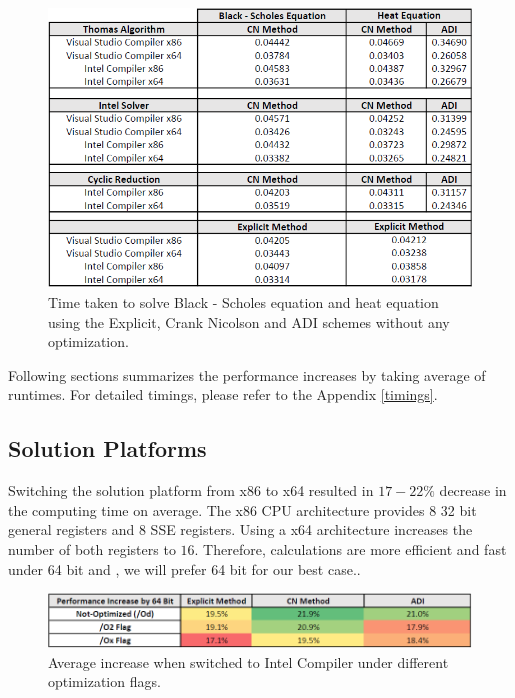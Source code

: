 \documentclass[12pt, oneside]{book}
\theoremstyle{plain}
\theoremstyle{definition}
\begin{document}
\begin{figure}[!htb]
    \centering
        \includegraphics[scale=0.6]{notOptimized.png}
    \caption{Time taken to solve Black - Scholes equation and heat equation using the Explicit, Crank Nicolson and ADI schemes  without any optimization.}
\end{figure}

Following sections summarizes the performance increases by taking average of runtimes. For detailed timings, please refer to the Appendix \ref{timings}.

\subsection{Solution Platforms} 
Switching the solution platform from x86 to x64 resulted in $17 - 22 \%$ decrease in the computing time on average.  The x86 CPU architecture provides $8$ 32 bit general registers and $8$ SSE registers. Using a x64 architecture increases the number of both registers  to $16$. Therefore, calculations are more efficient and fast under 64 bit and , we will prefer 64 bit for our best case..

\begin{figure}[!htb]
    \centering
        \includegraphics[scale=0.7]{bitPercent.png}
    \caption{Average increase when switched to Intel Compiler under different optimization flags.}
    \label{bitPercent}
\end{figure}
\end{document}
